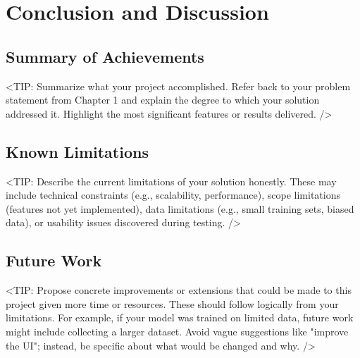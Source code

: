 \chapter{Conclusion and Discussion}
\label{chap:conclusion-discussion}

\section{Summary of Achievements}
\label{section:summary-of-achievements}
<TIP: Summarize what your project accomplished.
Refer back to your problem statement from Chapter 1 and
explain the degree to which your solution addressed it.
Highlight the most significant features or results delivered. />

\section{Known Limitations}
\label{section:limitations}
<TIP: Describe the current limitations of your solution honestly.
These may include technical constraints (e.g., scalability, performance),
scope limitations (features not yet implemented),
data limitations (e.g., small training sets, biased data),
or usability issues discovered during testing. />

\section{Future Work}
\label{section:future-work}
<TIP: Propose concrete improvements or extensions that
could be made to this project given more time or resources.
These should follow logically from your limitations.
For example, if your model was trained on limited data,
future work might include collecting a larger dataset.
Avoid vague suggestions like "improve the UI"; instead,
be specific about what would be changed and why. />